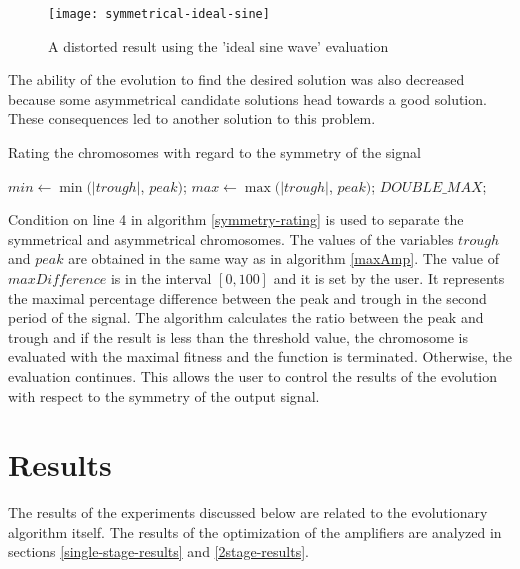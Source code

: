 \begin{figure}[H]
    \centerline{\texttt{[image: symmetrical-ideal-sine]}\label{symmetrical-ideal-sine}}
    \caption{A distorted result using the 'ideal sine wave' evaluation}
\end{figure}

The ability of the evolution to find the desired solution was also decreased because some asymmetrical candidate solutions head towards a good solution. These consequences led to another solution to this problem.

\begin{algorithm}
\caption{Rating the chromosomes with regard to the symmetry of the signal}
\label{symmetry-rating}
\begin{algorithmic}[1]
    \State $min \gets \min(|trough|$, $peak)$;
    \State $max \gets \max(|trough|$, $peak)$;
        \State \Return $DOUBLE\_MAX$;
    \EndIf
    \EndFunction
\end{algorithmic}
\end{algorithm}

Condition on line 4 in algorithm \ref{symmetry-rating} is used to separate the symmetrical and asymmetrical chromosomes. The values of the variables $trough$ and $peak$ are obtained in the same way as in algorithm \ref{maxAmp}. The value of $maxDifference$ is in the interval $\left[0, 100\right]$ and it is set by the user. It represents the maximal percentage difference between the peak and trough in the second period of the signal. The algorithm calculates the ratio between the peak and trough and if the result is less than the threshold value, the chromosome is evaluated with the maximal fitness and the function is terminated. Otherwise, the evaluation continues. This allows the user to control the results of the evolution with respect to the symmetry of the output signal.

\section{Results}
The results of the experiments discussed below are related to the evolutionary algorithm itself. The results of the optimization of the amplifiers are analyzed in sections \ref{single-stage-results} and \ref{2stage-results}.

